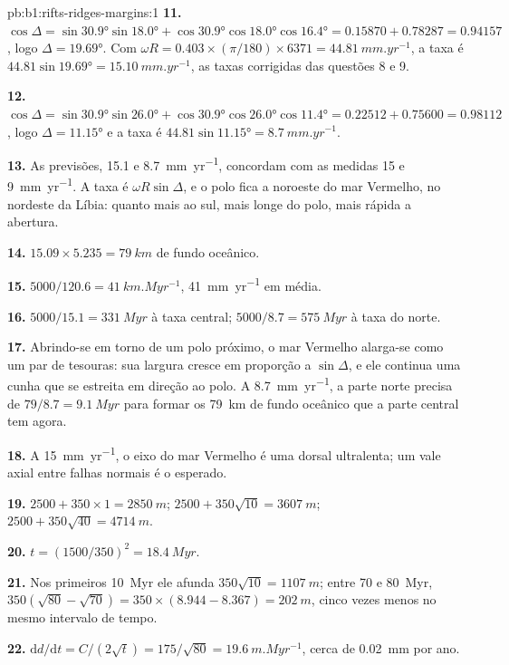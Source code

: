 \begin{solution}{pb:b1:rifts-ridges-margins:1}
\textbf{11.} $\cos\Delta = \sin\ang{30.9}\sin\ang{18.0} +
\cos\ang{30.9}\cos\ang{18.0}\cos\ang{16.4} = 0.15870 + 0.78287 = 0.94157$, logo
$\Delta = \ang{19.69}$. Com $\omega R = 0.403\times(\pi/180)\times6371 =
\qty{44.81}{mm.yr^{-1}}$, a taxa é $44.81\sin\ang{19.69} =
\qty{15.10}{mm.yr^{-1}}$, as taxas corrigidas das questões 8 e 9.

\textbf{12.} $\cos\Delta = \sin\ang{30.9}\sin\ang{26.0} +
\cos\ang{30.9}\cos\ang{26.0}\cos\ang{11.4} = 0.22512 + 0.75600 = 0.98112$, logo
$\Delta = \ang{11.15}$ e a taxa é $44.81\sin\ang{11.15} =
\qty{8.7}{mm.yr^{-1}}$.

\textbf{13.} As previsões, 15.1 e \qty{8.7}{mm.yr^{-1}}, concordam com as
medidas 15 e \qty{9}{mm.yr^{-1}}. A taxa é $\omega R\sin\Delta$, e o
polo fica a noroeste do mar Vermelho, no nordeste da Líbia: quanto mais ao sul, mais longe
do polo, mais rápida a abertura.

\textbf{14.} $15.09\times5.235 = \qty{79}{km}$ de fundo oceânico.

\textbf{15.} $5000/120.6 = \qty{41}{km.Myr^{-1}}$, \qty{41}{mm.yr^{-1}} em
média.

\textbf{16.} $5000/15.1 = \qty{331}{Myr}$ à taxa central;
$5000/8.7 = \qty{575}{Myr}$ à taxa do norte.

\textbf{17.} Abrindo-se em torno de um polo próximo, o mar Vermelho alarga-se como um par de
tesouras: sua largura cresce em proporção a $\sin\Delta$, e ele continua uma cunha
que se estreita em direção ao polo. A \qty{8.7}{mm.yr^{-1}}, a parte norte precisa de
$79/8.7 = \qty{9.1}{Myr}$ para formar os \qty{79}{km} de fundo oceânico que a
parte central tem agora.

\textbf{18.} A \qty{15}{mm.yr^{-1}}, o eixo do mar Vermelho é uma dorsal ultralenta; um
vale axial entre falhas normais é o esperado.

\textbf{19.} $2500 + 350\times1 = \qty{2850}{m}$;
$2500 + 350\sqrt{10} = \qty{3607}{m}$; $2500 + 350\sqrt{40} = \qty{4714}{m}$.

\textbf{20.} $t = (1500/350)^2 = \qty{18.4}{Myr}$.

\textbf{21.} Nos primeiros \qty{10}{Myr} ele afunda $350\sqrt{10} = \qty{1107}{m}$;
entre 70 e \qty{80}{Myr}, $350(\sqrt{80} - \sqrt{70}) = 350\times(8.944 -
8.367) = \qty{202}{m}$, cinco vezes menos no mesmo intervalo de tempo.

\textbf{22.} $\mathrm dd/\mathrm dt = C/(2\sqrt t) = 175/\sqrt{80} =
\qty{19.6}{m.Myr^{-1}}$, cerca de \qty{0.02}{mm} por ano.


\end{solution}
